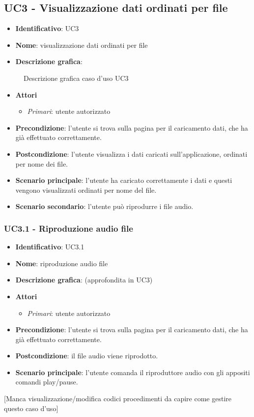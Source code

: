 
\subsection{UC3 - Visualizzazione dati ordinati per file}
\begin{itemize}
  \item \textbf{Identificativo}: UC3
  \item \textbf{Nome}: visualizzazione dati ordinati per file
  \item \textbf{Descrizione grafica}:
\end{itemize}

\begin{figure}[h]
  \centering
  \caption{Descrizione grafica caso d'uso UC3}
\end{figure}

\begin{itemize}
  \item \textbf{Attori}
        \begin{itemize}
          \item \textit{Primari}: utente autorizzato
        \end{itemize}
  \item \textbf{Precondizione}: l'utente si trova sulla pagina per il caricamento dati, che ha già effettuato correttamente.
  \item \textbf{Postcondizione}: l'utente visualizza i dati caricati sull'applicazione, ordinati per nome dei file.
  \item \textbf{Scenario principale}: l'utente ha caricato correttamente i dati e questi vengono visualizzati ordinati per nome del file.
  \item \textbf{Scenario secondario}: l'utente può riprodurre i file audio.
\end{itemize}

\subsubsection{UC3.1 - Riproduzione audio file}
\begin{itemize}
  \item \textbf{Identificativo}: UC3.1
  \item \textbf{Nome}: riproduzione audio file
  \item \textbf{Descrizione grafica}: (approfondita in UC3)
  \item \textbf{Attori}
        \begin{itemize}
          \item \textit{Primari}: utente autorizzato
        \end{itemize}
  \item \textbf{Precondizione}: l'utente si trova sulla pagina per il caricamento dati, che ha già effettuato correttamente.
  \item \textbf{Postcondizione}: il file audio viene riprodotto.
  \item \textbf{Scenario principale}: l'utente comanda il riproduttore audio con gli appositi comandi play/pause.
\end{itemize}

[Manca visualizzazione/modifica codici procedimenti da capire come gestire questo caso d'uso]
